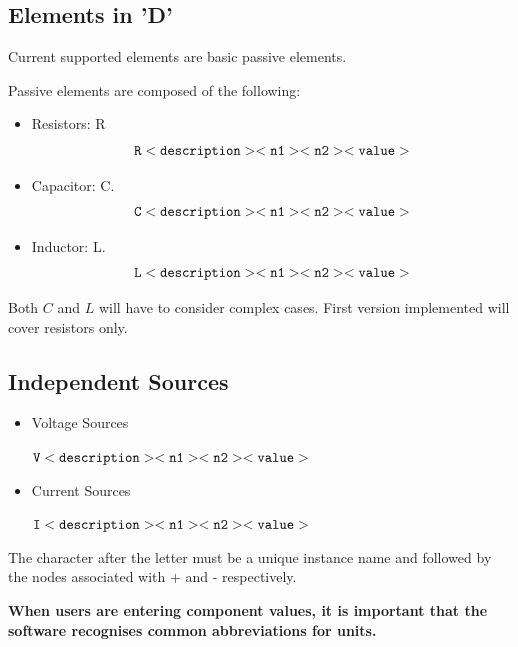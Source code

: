 \documentclass[a4paper, titlepage]{article}
\begin{document}
    \subsection{Elements in {\selectfont 'D'}}
    Current supported elements are basic passive elements. \par
    Passive elements are composed of the following:
    \begin{itemize}
        \item Resistors: {\selectfont R} $$ \tt R<description> <n1> <n2> <value> $$
        \item Capacitor: {\selectfont C}. $$ \tt C<description> <n1> <n2> <value>$$
        \item Inductor: {\selectfont L}. $$ \tt L<description> <n1> <n2> <value>$$
    \end{itemize}
    Both $C$ and $L$ will have to consider complex cases. First version implemented will cover resistors only.
    \subsection{Independent Sources}
    \begin{itemize}
        \item Voltage Sources 
        \begin{center}
            $\tt V<description> <n1> <n2><value>$
        \end{center}
        \item Current Sources
        \begin{center}
            $\tt I<description> <n1> <n2><value>$
        \end{center}
    \end{itemize}

    \par
    The character after the letter must be a unique instance name and followed by the nodes associated with + and - respectively.
    \par
    \textbf {When users are entering component values, it is important that the software recognises common abbreviations 
    for units.}
\end{document}
